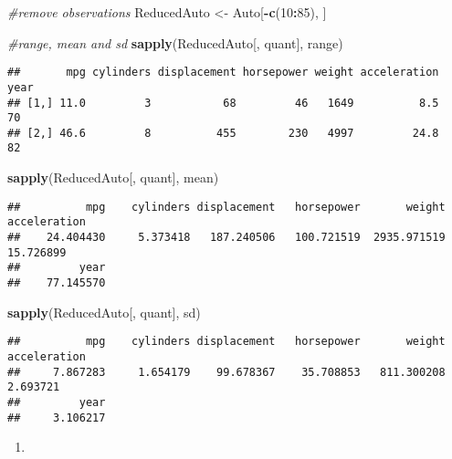 \documentclass[
]{article}
\newenvironment{Shaded}{\begin{snugshade}}{\end{snugshade}}
\newcommand{\CommentTok}[1]{\textcolor[rgb]{0.56,0.35,0.01}{\textit{#1}}}
\newcommand{\DecValTok}[1]{\textcolor[rgb]{0.00,0.00,0.81}{#1}}
\newcommand{\FunctionTok}[1]{\textcolor[rgb]{0.13,0.29,0.53}{\textbf{#1}}}
\newcommand{\NormalTok}[1]{#1}
\newcommand{\OtherTok}[1]{\textcolor[rgb]{0.56,0.35,0.01}{#1}}
\newcommand{\SpecialCharTok}[1]{\textcolor[rgb]{0.81,0.36,0.00}{\textbf{#1}}}
\providecommand{\tightlist}{%
  \setlength{\itemsep}{0pt}\setlength{\parskip}{0pt}}
\begin{document}
\begin{Shaded}
\begin{Highlighting}[]
\CommentTok{\#remove observations}
\NormalTok{ReducedAuto }\OtherTok{\textless{}{-}}\NormalTok{ Auto[}\SpecialCharTok{{-}}\FunctionTok{c}\NormalTok{(}\DecValTok{10}\SpecialCharTok{:}\DecValTok{85}\NormalTok{), ]}

\CommentTok{\#range, mean and sd}
\FunctionTok{sapply}\NormalTok{(ReducedAuto[, quant], range)}
\end{Highlighting}
\end{Shaded}

\begin{verbatim}
##       mpg cylinders displacement horsepower weight acceleration year
## [1,] 11.0         3           68         46   1649          8.5   70
## [2,] 46.6         8          455        230   4997         24.8   82
\end{verbatim}

\begin{Shaded}
\begin{Highlighting}[]
\FunctionTok{sapply}\NormalTok{(ReducedAuto[, quant], mean)}
\end{Highlighting}
\end{Shaded}

\begin{verbatim}
##          mpg    cylinders displacement   horsepower       weight acceleration 
##    24.404430     5.373418   187.240506   100.721519  2935.971519    15.726899 
##         year 
##    77.145570
\end{verbatim}

\begin{Shaded}
\begin{Highlighting}[]
\FunctionTok{sapply}\NormalTok{(ReducedAuto[, quant], sd)}
\end{Highlighting}
\end{Shaded}

\begin{verbatim}
##          mpg    cylinders displacement   horsepower       weight acceleration 
##     7.867283     1.654179    99.678367    35.708853   811.300208     2.693721 
##         year 
##     3.106217
\end{verbatim}

\begin{enumerate}
\def\labelenumi{\alph{enumi})}
\setcounter{enumi}{4}
\tightlist
\item
\end{enumerate}
\end{document}
